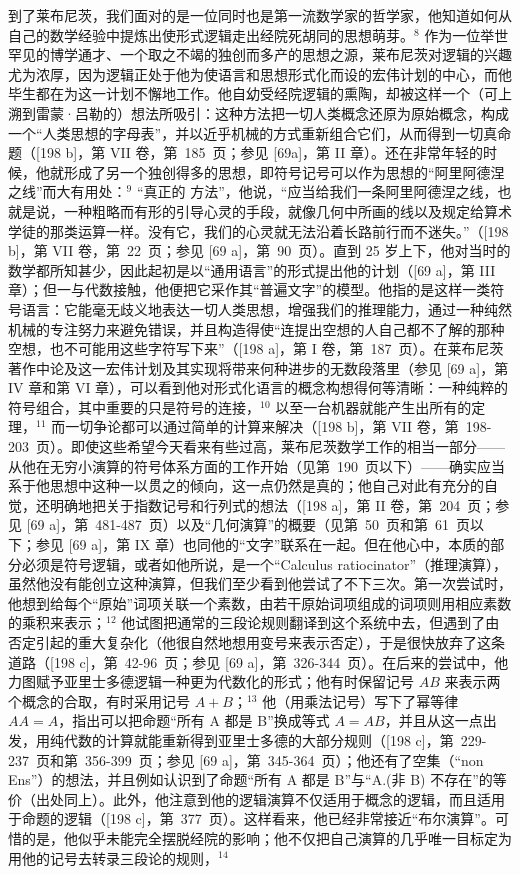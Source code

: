 到了莱布尼茨，我们面对的是一位同时也是第一流数学家的哲学家，他知道如何从自己的数学经验中提炼出使形式逻辑走出经院死胡同的思想萌芽。\(^{8}\) 作为一位举世罕见的博学通才、一个取之不竭的独创而多产的思想之源，莱布尼茨对逻辑的兴趣尤为浓厚，因为逻辑正处于他为使语言和思想形式化而设的宏伟计划的中心，而他毕生都在为这一计划不懈地工作。他自幼受经院逻辑的熏陶，却被这样一个（可上溯到雷蒙·吕勒的）想法所吸引：这种方法把一切人类概念还原为原始概念，构成一个“人类思想的字母表”，并以近乎机械的方式重新组合它们，从而得到一切真命题（{[}198 b{]}，第 VII 卷，第~185~页；参见 {[}69a{]}，第 II 章）。还在非常年轻的时候，他就形成了另一个独创得多的思想，即符号记号可以作为思想的“阿里阿德涅之线”而大有用处：\(^{9}\) “真正的 方法”，他说，“应当给我们一条阿里阿德涅之线，也就是说，一种粗略而有形的引导心灵的手段，就像几何中所画的线以及规定给算术学徒的那类运算一样。没有它，我们的心灵就无法沿着长路前行而不迷失。”（{[}198 b{]}，第 VII 卷，第~22~页；参见 {[}69 a{]}，第~90~页）。直到 25 岁上下，他对当时的数学都所知甚少，因此起初是以“通用语言”的形式提出他的计划（{[}69 a{]}，第 III 章）；但一与代数接触，他便把它采作其“普遍文字”的模型。他指的是这样一类符号语言：它能毫无歧义地表达一切人类思想，增强我们的推理能力，通过一种纯然机械的专注努力来避免错误，并且构造得使“连提出空想的人自己都不了解的那种空想，也不可能用这些字符写下来”（{[}198 a{]}，第 I 卷，第~187~页）。在莱布尼茨著作中论及这一宏伟计划及其实现将带来何种进步的无数段落里（参见 {[}69 a{]}，第 IV 章和第 VI 章），可以看到他对形式化语言的概念构想得何等清晰：一种纯粹的符号组合，其中重要的只是符号的连接，\(^{10}\) 以至一台机器就能产生出所有的定理，\(^{11}\) 而一切争论都可以通过简单的计算来解决（{[}198 b{]}，第 VII 卷，第~198-203~页）。即使这些希望今天看来有些过高，莱布尼茨数学工作的相当一部分——从他在无穷小演算的符号体系方面的工作开始（见第~190~页以下）——确实应当系于他思想中这种一以贯之的倾向，这一点仍然是真的；他自己对此有充分的自觉，还明确地把关于指数记号和行列式的想法（{[}198 a{]}，第 II 卷，第~204~页；参见 {[}69 a{]}，第~481-487~页）以及“几何演算”的概要（见第~50~页和第~61~页以下；参见 {[}69 a{]}，第 IX 章）也同他的“文字”联系在一起。但在他心中，本质的部分必须是符号逻辑，或者如他所说，是一个“Calculus ratiocinator”（推理演算），虽然他没有能创立这种演算，但我们至少看到他尝试了不下三次。第一次尝试时，他想到给每个“原始”词项关联一个素数，由若干原始词项组成的词项则用相应素数的乘积来表示；\(^{12}\) 他试图把通常的三段论规则翻译到这个系统中去，但遇到了由否定引起的重大复杂化（他很自然地想用变号来表示否定），于是很快放弃了这条道路（{[}198 c{]}，第~42-96~页；参见 {[}69 a{]}，第~326-344~页）。在后来的尝试中，他力图赋予亚里士多德逻辑一种更为代数化的形式；他有时保留记号 \(AB\) 来表示两个概念的合取，有时采用记号 \(A + B\)；\(^{13}\) 他（用乘法记号）写下了幂等律 \(AA = A\)，指出可以把命题“所有 A 都是 B”换成等式 \(A = AB\)，并且从这一点出发，用纯代数的计算就能重新得到亚里士多德的大部分规则（{[}198 c{]}，第~229-237~页和第~356-399~页；参见 {[}69 a{]}，第~345-364~页）；他还有了空集（“non Ens”）的想法，并且例如认识到了命题“所有 A 都是 B”与“A.(非 B) 不存在”的等价（出处同上）。此外，他注意到他的逻辑演算不仅适用于概念的逻辑，而且适用于命题的逻辑（{[}198 c{]}，第~377~页）。这样看来，他已经非常接近“布尔演算”。可惜的是，他似乎未能完全摆脱经院的影响；他不仅把自己演算的几乎唯一目标定为用他的记号去转录三段论的规则，\(^{14}\) 